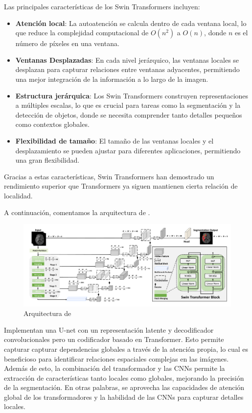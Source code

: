 	Las principales características de los Swin Transformers incluyen:
	
	\begin{itemize}
		\item \textbf{Atención local}: La autoatención se calcula dentro de cada ventana local, lo que reduce la complejidad computacional de $O(n^2)$ a $O(n)$, donde $n$ es el número de píxeles en una ventana.
		\item \textbf{Ventanas Desplazadas}: En cada nivel jerárquico, las ventanas locales se desplazan para capturar relaciones entre ventanas adyacentes, permitiendo una mejor integración de la información a lo largo de la imagen.
		\item \textbf{Estructura jerárquica}: Los Swin Transformers construyen representaciones a múltiples escalas, lo que es crucial para tareas como la segmentación y la detección de objetos, donde se necesita comprender tanto detalles pequeños como contextos globales.
		\item \textbf{Flexibilidad de tamaño}: El tamaño de las ventanas locales y el desplazamiento se pueden ajustar para diferentes aplicaciones, permitiendo una gran flexibilidad.
	\end{itemize}
	
	Gracias a estas características, Swin Transformers han demostrado un rendimiento superior que Transformers ya siguen mantienen cierta relación de localidad.
	
	A continuación, comentamos la arquitectura de \cite{hatamizadeh2021swin}.
	
	\begin{figure}[H]
		\centering
		\includegraphics[width=1.0\linewidth]{imagenes/swinunet.png}
		\caption{Arquitectura de \cite{hatamizadeh2021swin}}
	\end{figure}
	
	Implementan una U-net con un representación latente y decodificador convolucionales pero un codificador basado en Transformer. Esto permite capturar capturar dependencias globales a través de la atención propia, lo cual es beneficioso para identificar relaciones espaciales complejas en las imágenes. Además de esto, la combinación del transformador y las CNNs permite la extracción de características tanto locales como globales, mejorando la precisión de la segmentación. En otras palabras, se aprovecha las capacidades de atención global de los transformadores y la habilidad de las CNNs para capturar detalles locales.
	
